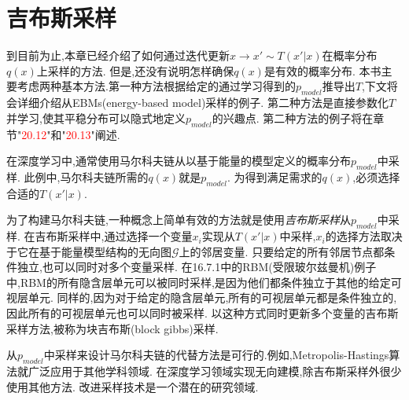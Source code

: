 \section{吉布斯采样}
\label{sec:17.4}

到目前为止,本章已经介绍了如何通过迭代更新$x\rightarrow x' \sim T (x'|x) $在概率分布$q(x)$上采样的方法.
但是,还没有说明怎样确保$q(x)$是有效的概率分布.
本书主要考虑两种基本方法.第一种方法根据给定的通过学习得到的$p_{model}$推导出$T$,下文将会详细介绍从EBMs(energy-based model)采样的例子.
第二种方法是直接参数化$T$并学习,使其平稳分布可以隐式地定义$p_{model}$的兴趣点.
第二种方法的例子将在章节"\textcolor{red}{20.12}"和"\textcolor{red}{20.13}"阐述.

在深度学习中,通常使用马尔科夫链从以基于能量的模型定义的概率分布$p_{model}$中采样.
此例中,马尔科夫链所需的$q(x)$就是$p_{model}$.
为得到满足需求的$q(x)$,必须选择合适的$T(x'|x)$.

为了构建马尔科夫链,一种概念上简单有效的方法就是使用\textit{吉布斯采样}从$p_{model}$中采样.
在吉布斯采样中,通过选择一个变量$x_i$实现从$T(x'|x)$中采样,$x_i$的选择方法取决于它在基于能量模型结构的无向图$\mathcal{G}$上的邻居变量.
只要给定的所有邻居节点都条件独立,也可以同时对多个变量采样.
在16.7.1中的RBM(受限玻尔兹曼机)例子中,RBM的所有隐含层单元可以被同时采样,是因为他们都条件独立于其他的给定可视层单元.
同样的,因为对于给定的隐含层单元,所有的可视层单元都是条件独立的,因此所有的可视层单元也可以同时被采样.
以这种方式同时更新多个变量的吉布斯采样方法,被称为块吉布斯(block gibbs)采样.

从$p_{model}$中采样来设计马尔科夫链的代替方法是可行的.例如,Metropolis-Hastings算法就广泛应用于其他学科领域.
在深度学习领域实现无向建模,除吉布斯采样外很少使用其他方法.
改进采样技术是一个潜在的研究领域.
